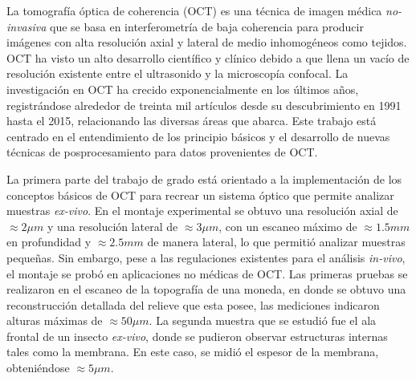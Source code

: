 %
%
%
La tomografía óptica de coherencia (OCT) es una técnica de imagen médica \textit{no-invasiva} que se basa en interferometría de baja coherencia para producir imágenes con alta resolución axial y lateral de medio inhomogéneos como tejidos. OCT ha visto un alto desarrollo científico y clínico debido a que llena un vacío de resolución existente entre el ultrasonido y la microscopía confocal. La investigación en OCT ha crecido exponencialmente en los últimos años, registrándose alrededor de treinta mil artículos desde su descubrimiento en 1991 hasta el 2015, relacionando las diversas áreas que abarca. Este trabajo está centrado en el entendimiento de los principio básicos y el desarrollo de nuevas técnicas de posprocesamiento para datos provenientes de OCT.

La primera parte del trabajo de grado está orientado a la implementación de los conceptos básicos de OCT para recrear un sistema óptico que permite analizar muestras \textit{ex-vivo}. En el montaje experimental se obtuvo una resolución axial de $\approx2\mu m$ y una resolución lateral de $\approx3 \mu m$, con un escaneo máximo de $\approx1.5mm$ en profundidad y $\approx2.5mm$ de manera lateral, lo que permitió analizar muestras pequeñas. Sin embargo, pese a las regulaciones existentes para el análisis \textit{in-vivo}, el montaje se probó en aplicaciones no médicas de OCT. Las primeras pruebas se realizaron en el escaneo de la topografía de una moneda, en donde se obtuvo una reconstrucción detallada del relieve que esta posee, las mediciones indicaron alturas máximas de $\approx50\mu m$. La segunda muestra que se estudió fue el ala frontal de un insecto \textit{ex-vivo}, donde se pudieron observar estructuras internas tales como la membrana. En este caso, se midió el espesor de la membrana, obteniéndose $\approx5\mu m$.

